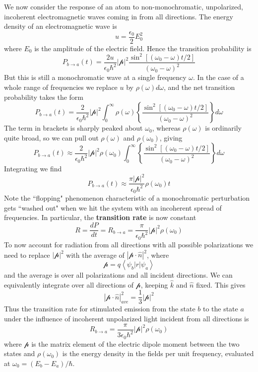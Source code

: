 \documentclass[12pt, a4paper, oneside, openright, titlepage]{book}
\newcommand{\brkt}[1]{\left\langle #1\right\rangle}
\begin{document}
We now consider the response of an atom to non-monochromatic, unpolarized, incoherent electromagnetic waves coming in from all directions. The energy density of an electromagnetic wave is $$u = \frac{\epsilon_0}{2}E_0^2$$
where $E_0$ is the amplitude of the electric field. Hence the transition probability is $$P_{b\rightarrow a}(t) = \frac{2u}{\epsilon_0\hbar^2}|\mathcal{p}|^2\frac{\sin^2[(\omega_0-\omega)t/2]}{(\omega_0-\omega)^2}$$
But this is still a monochromatic wave at a single frequency $\omega$. In the case of a whole range of frequencies we replace $u$ by $\rho(\omega)d\omega$, and the net transition probability takes the form $$P_{b\rightarrow a}(t) = \frac{2}{\epsilon_0\hbar^2}|\mathcal{p}|^2\int_0^{\infty}\rho(\omega)\left\{\frac{\sin^2[(\omega_0-\omega)t/2]}{(\omega_0-\omega)^2}\right\}d\omega$$
The term in brackets is sharply peaked about $\omega_0$, whereas $\rho(\omega)$ is ordinarily quite broad, so we can pull out $\rho(\omega)$ and $\rho(\omega_0)$, giving $$P_{b\rightarrow a}(t) \approx \frac{2}{\epsilon_0\hbar^2}|\mathcal{p}|^2\rho(\omega_0)\int_0^{\infty}\left\{\frac{\sin^2[(\omega_0-\omega)t/2]}{(\omega_0-\omega)^2}\right\}d\omega$$
Integrating we find $$P_{b\rightarrow a}(t)\approx \frac{\pi|\mathcal{p}|^2}{\epsilon_0\hbar^2}\rho(\omega_0)t$$
Note the ``flopping" phenomenon characteristic of a monochromatic perturbation gets ``washed out" when we hit the system with an incoherent spread of frequencies. In particular, the \textbf{transition rate} is now constant $$R = \frac{dP}{dt} = R_{b\rightarrow a} = \frac{\pi}{\epsilon_0\hbar^2}|\mathcal{p}|^2\rho(\omega_0)$$
To now account for radiation from all directions with all possible polarizations we need to replace $|\mathcal{p}|^2$ with the average of $|\mathbf{\mathcal{p}}\cdot\hat{n}|^2$, where $$\mathbf{\mathcal{p}} = q\brkt{\psi_b|r|\psi_a}$$
and the average is over all polarizations and all incident directions. We can equivalently integrate over all directions of $\mathbf{\mathcal{p}}$, keeping $\hat{k}$ and $\hat{n}$ fixed. This gives $$|\mathbf{\mathcal{p}}\cdot\hat{n}|^2_{ave} = \frac{1}{3}|\mathbf{\mathcal{p}}|^2$$
Thus the transition rate for stimulated emission from the state $b$ to the state $a$ under the influence of incoherent unpolarized light incident from all directions is $$R_{b\rightarrow a}=\frac{\pi}{3\epsilon_0\hbar^2}|\mathbf{\mathcal{p}}|^2\rho(\omega_0)$$
where $\mathbf{\mathcal{p}}$ is the matrix element of the electric dipole moment between the two states and $\rho(\omega_0)$ is the energy density in the fields per unit frequency, evaluated at $\omega_0 = (E_b-E_a)/\hbar$.
\end{document}
